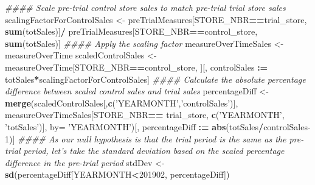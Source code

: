 \documentclass[]{article}
\newenvironment{Shaded}{\begin{snugshade}}{\end{snugshade}}
\newcommand{\CommentTok}[1]{\textcolor[rgb]{0.56,0.35,0.01}{\textit{#1}}}
\newcommand{\DataTypeTok}[1]{\textcolor[rgb]{0.13,0.29,0.53}{#1}}
\newcommand{\DecValTok}[1]{\textcolor[rgb]{0.00,0.00,0.81}{#1}}
\newcommand{\ErrorTok}[1]{\textcolor[rgb]{0.64,0.00,0.00}{\textbf{#1}}}
\newcommand{\KeywordTok}[1]{\textcolor[rgb]{0.13,0.29,0.53}{\textbf{#1}}}
\newcommand{\NormalTok}[1]{#1}
\newcommand{\OperatorTok}[1]{\textcolor[rgb]{0.81,0.36,0.00}{\textbf{#1}}}
\newcommand{\StringTok}[1]{\textcolor[rgb]{0.31,0.60,0.02}{#1}}
\begin{document}
\begin{Shaded}
\begin{Highlighting}[]
\CommentTok{#### Scale pre-trial control store sales to match pre-trial trial store sales}
\NormalTok{scalingFactorForControlSales <-}\StringTok{ }\NormalTok{preTrialMeasures[STORE_NBR}\OperatorTok{==}\NormalTok{trial_store, }\KeywordTok{sum}\NormalTok{(totSales)]}\OperatorTok{/}
\StringTok{                                }\NormalTok{preTrialMeasures[STORE_NBR}\OperatorTok{==}\NormalTok{control_store, }\KeywordTok{sum}\NormalTok{(totSales)]}
\CommentTok{#### Apply the scaling factor}
\NormalTok{measureOverTimeSales <-}\StringTok{ }\NormalTok{measureOverTime}
\NormalTok{scaledControlSales <-}\StringTok{ }\NormalTok{measureOverTime[STORE_NBR}\OperatorTok{==}\NormalTok{control_store, }
\NormalTok{                                      ][, controlSales }\OperatorTok{:}\ErrorTok{=}\StringTok{ }\NormalTok{totSales}\OperatorTok{*}\NormalTok{scalingFactorForControlSales]}
\CommentTok{#### Calculate the absolute percentage difference between scaled control sales and trial sales}
\NormalTok{percentageDiff <-}\StringTok{ }\KeywordTok{merge}\NormalTok{(scaledControlSales[,}\KeywordTok{c}\NormalTok{(}\StringTok{'YEARMONTH'}\NormalTok{,}\StringTok{'controlSales'}\NormalTok{)], }
\NormalTok{                        measureOverTimeSales[STORE_NBR}\OperatorTok{==}\StringTok{ }\NormalTok{trial_store, }\KeywordTok{c}\NormalTok{(}\StringTok{'YEARMONTH'}\NormalTok{, }\StringTok{'totSales'}\NormalTok{)], }
                        \DataTypeTok{by=} \StringTok{'YEARMONTH'}\NormalTok{)[, percentageDiff }\OperatorTok{:}\ErrorTok{=}\StringTok{ }\KeywordTok{abs}\NormalTok{(totSales}\OperatorTok{/}\NormalTok{controlSales}\DecValTok{-1}\NormalTok{)]}
\CommentTok{#### As our null hypothesis is that the trial period is the same as the pre-trial period, let's take the standard deviation based on the scaled percentage difference in the pre-trial period}
\NormalTok{stdDev <-}\StringTok{ }\KeywordTok{sd}\NormalTok{(percentageDiff[YEARMONTH}\OperatorTok{<}\DecValTok{201902}\NormalTok{, percentageDiff])}


\end{Highlighting}
\end{Shaded}
\end{document}
